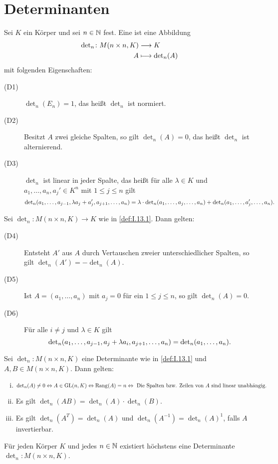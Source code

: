 \section{Determinanten}

\begin{definition}[Determinante]
	\label{def:I.13.1}
	Sei $K$ ein Körper und sei $n \in \mathbb{N}$ fest.
	Eine  ist eine Abbildung
	\begin{align*}
		\operatorname{\det\,\!}_n\colon M(n \times n,K) &\longrightarrow K \\
		A &\longmapsto \operatorname{\det\,\!}_n(A)
	\end{align*}
	mit folgenden Eigenschaften:
	\begin{description}
		\item[(D1)] $\det_n(E_n) = 1$, das heißt $\det_n$ ist normiert.
		\item[(D2)] Besitzt $A$ zwei gleiche Spalten, so gilt $\det_n(A) = 0$, das heißt $\det_n$ ist alternierend.
		\item[(D3)] $\det_n$ ist linear in jeder Spalte, das heißt für alle $\lambda \in K$ und $a_1,\dots,a_n,a_j' \in K^n$ mit $1 \leq j \leq n$ gilt
		\[
			\operatorname{\det\,\!}_n(a_1,\dots,a_{j-1},\lambda a_j + a_j',a_{j+1},\dots,a_n) = \lambda\cdot \operatorname{\det\,\!}_n(a_1,\dots,a_j,\dots,a_n) + \operatorname{\det\,\!}_n(a_1,\dots,a_j',\dots,a_n).
		\]  
	\end{description}
\end{definition}

\begin{satz}
	\label{satz:I.13.2}
	Sei $\det_n\colon M(n \times n,K) \rightarrow K$ wie in \autoref{def:I.13.1}.
	Dann gelten:
	\begin{description}
		\item[(D4)] Entsteht $A'$ aus $A$ durch Vertauschen zweier unterschiedlicher Spalten, so gilt $\det_n(A') = -\det_n(A)$.
		\item[(D5)] Ist $A = (a_1,\dots,a_n)$ mit $a_j = 0$ für ein $1 \leq j \leq n$, so gilt $\det_n(A) = 0$.
		\item[(D6)] Für alle $i \neq j$ und $\lambda \in K$ gilt
		\[
			\operatorname{\det\,\!}_n(a_1,\dots,a_{j-1},a_j+\lambda a_i,a_{j+1},\dots,a_n) = \operatorname{\det\,\!}_n(a_1,\dots,a_n).
		\] 
	\end{description}
\end{satz}

\setcounter{definition}{4}
\begin{satz}
	\label{satz:I.13.5}
	Sei $\det_n\colon M(n\times n,K)$ eine Determinante wie in \autoref{def:I.13.1} und $A,B \in M(n \times n,K)$.
	Dann gelten:
	\begin{enumerate}[(i)]
		\item	$\det_n(A) \neq 0 \Leftrightarrow A \in \operatorname{GL}(n,K) \Leftrightarrow \operatorname{Rang}(A) = n \Leftrightarrow \text{ Die Spalten bzw. Zeilen von } A \text{ sind linear unabhängig.}$
		\item Es gilt $\det_n(AB) = \det_n(A) \cdot \det_n(B)$.
		\item Es gilt $\det_n(A^T) = \det_n(A)$ und $\det_n(A^{-1}) = \det_n(A)^{1}$, falls $A$ invertierbar.
	\end{enumerate}
\end{satz}

\setcounter{definition}{7}
\begin{korollar}
	\label{kor:I.13.8}
	Für jeden Körper $K$ und jedes $n \in \mathbb{N}$ existiert höchstens eine Determinante $\det_n\colon M(n \times n,K)$.
\end{korollar}
\newpage